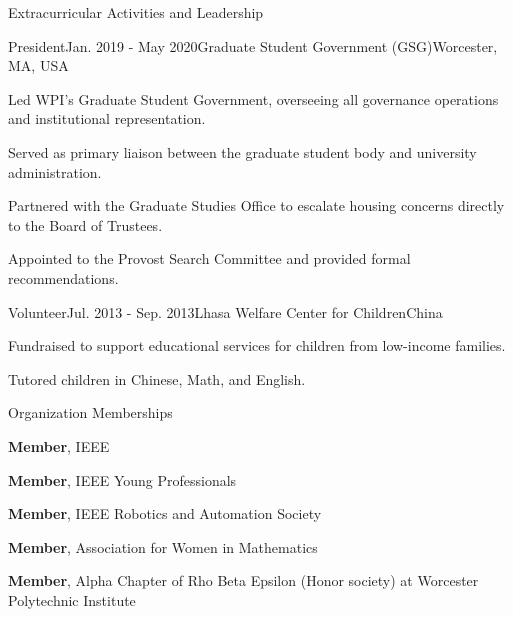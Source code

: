 \documentclass{resume} %
\begin{document}
\begin{rSection}{Extracurricular Activities and Leadership}

\begin{rSubsection}{President}{Jan. 2019 - May 2020}{Graduate Student Government (GSG)}{Worcester, MA, USA}
\item Led WPI's Graduate Student Government, overseeing all governance operations and institutional representation.
\item Served as primary liaison between the graduate student body and university administration.
\item Partnered with the Graduate Studies Office to escalate housing concerns directly to the Board of Trustees.
\item Appointed to the Provost Search Committee and provided formal recommendations.
\end{rSubsection}

\begin{rSubsection}{Volunteer}{Jul. 2013 - Sep. 2013}{Lhasa Welfare Center for Children}{China}
\item Fundraised to support educational services for children from low-income families.
\item Tutored children in Chinese, Math, and English.
\end{rSubsection}

\end{rSection}

\begin{lSection}{Organization Memberships}
\item {\bf Member}, IEEE
\item {\bf Member}, IEEE Young Professionals
\item {\bf Member}, IEEE Robotics and Automation Society
\item {\bf Member}, Association for Women in Mathematics
\item {\bf Member}, Alpha Chapter of Rho Beta Epsilon (Honor society) at Worcester Polytechnic Institute
\end{lSection}
\end{document}
